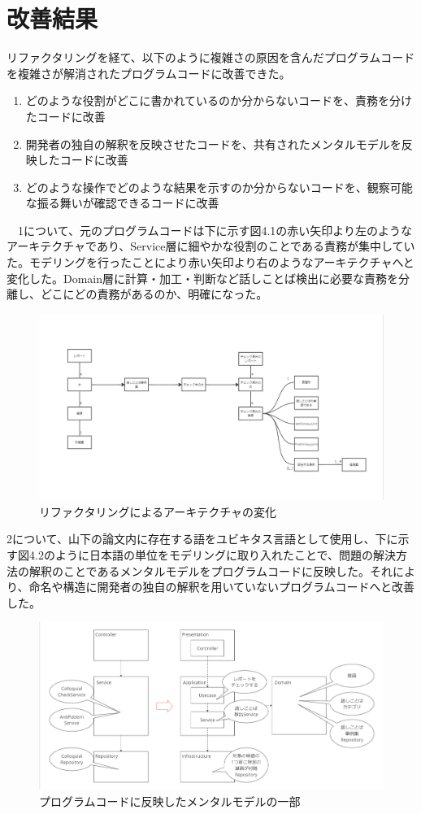 \documentclass[12pt, a4paper]{jreport}
\begin{document}
\section{改善結果}
リファクタリングを経て、以下のように複雑さの原因を含んだプログラムコードを複雑さが解消されたプログラムコードに改善できた。
\begin{enumerate}
\item どのような役割がどこに書かれているのか分からないコードを、責務を分けたコードに改善
\item 開発者の独自の解釈を反映させたコードを、共有されたメンタルモデルを反映したコードに改善
\item どのような操作でどのような結果を示すのか分からないコードを、観察可能な振る舞いが確認できるコードに改善
\end{enumerate}
　1について、元のプログラムコードは下に示す図4.1の赤い矢印より左のようなアーキテクチャであり、Service層に細やかな役割のことである責務が集中していた。モデリングを行ったことにより赤い矢印より右のようなアーキテクチャへと変化した。Domain層に計算・加工・判断など話しことば検出に必要な責務を分離し、どこにどの責務があるのか、明確になった。
\begin{figure}[H]
\centering
\includegraphics[width=1\linewidth]{image/kaizen2.png}
\caption{リファクタリングによるアーキテクチャの変化}
\label{fig:enter-label}
\end{figure}
2について、山下の論文内に存在する語をユビキタス言語として使用し、下に示す図4.2のように日本語の単位をモデリングに取り入れたことで、問題の解決方法の解釈のことであるメンタルモデルをプログラムコードに反映した。それにより、命名や構造に開発者の独自の解釈を用いていないプログラムコードへと改善した。
\begin{figure}[H]
\centering
\includegraphics[width=1\linewidth]{image/kaizen1.png}
\caption{プログラムコードに反映したメンタルモデルの一部}
\label{fig:enter-label}
\end{figure}
\end{document}
